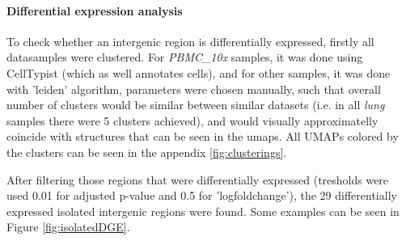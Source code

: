 \paragraph{Differential expression analysis}

To check whether an intergenic region is differentially expressed, firstly all datasamples were clustered.
For \textit{PBMC\_10x} samples, it was done using CellTypist (which as well annotates cells),
and for other samples, it was done with 'leiden' algorithm, parameters were chosen manually,
such that overall number of clusters would be similar between similar datasets (i.e. in all \textit{lung} samples there were 5 clusters achieved),
and would visually approximatelly coincide with structures that can be seen in the umaps.
All UMAPs colored by the clusters can be seen in the appendix \ref{fig:clusterings}.

After filtering those regions that were differentially expressed (tresholds were used 0.01 for adjusted p-value and 0.5 for 'logfoldchange'),
the 29 differentially expressed isolated intergenic regions were found.
Some examples can be seen in Figure \ref{fig:isolatedDGE}.


